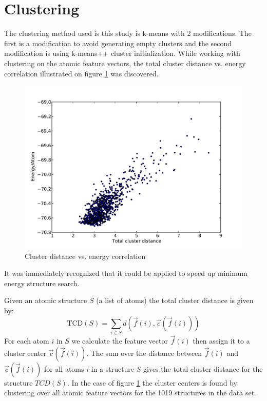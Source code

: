 \documentclass[%
 aps,
 prl,%
 amsmath,amssymb,
 reprint,%
]{revtex4-1}
\begin{document}
\section{Clustering}
The clustering method used is this study is k-means with 2
modifications. The first is a modification to avoid generating empty
clusters \cite{Malay2009} and the second modification is using
k-means++ cluster initialization. While working with clustering on the
atomic feature vectors, the total cluster distance vs. energy correlation
illustrated on figure \ref{fig_corr} was discovered. 

\begin{figure}[h]
    \centering
    \includegraphics[width=1.0\columnwidth]{decoorL2_5_fgen_Ti13O26Ridge_9_11_9_1510066208.pdf}
    \caption{Cluster distance vs. energy correlation}
    \label{fig_corr}
\end{figure}


It was immediately recognized that it could be applied to speed up minimum energy structure search.

Given an atomic structure $S$ (a list of atoms) the total cluster distance is given by:
\begin{equation}
\text{TCD}(S) = \sum_{i \in S} d(\vec f(i), \vec c(\vec f(i))) \label{eq3}
\end{equation}
For each atom $i$ in $S$ we calculate the feature vector $\vec f(i)$ then 
assign it to a cluster center $\vec c(\vec f(i))$.   
The sum over the distance between $\vec f(i)$ and $\vec c(\vec f(i))$ for all atoms $i$ in a structure $S$ 
gives the total cluster distance for the structure $TCD(S)$.
In the case of figure \ref{fig_corr} the cluster centers is found by clustering over all atomic feature vectors 
for the 1019 structures in the data set. 
\end{document}
